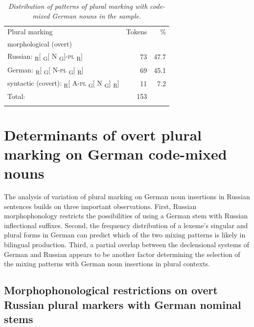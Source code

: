 \begin{table}
\begin{tabularx}{.81\textwidth}{l@{\hskip 30pt}r@{\hskip 30pt}r}
 \midrule  \addlinespace[2mm]
	Plural marking & Tokens & \% \\ \addlinespace[2mm] \midrule
			\addlinespace[2mm]
	morphological (overt) & & \\
	\hspace{10mm} Russian: {\textsubscript{R}[  \textsubscript{G}[ N \textsubscript{G}]-\textsc{pl} \textsubscript{R}]} & 73 & 47.7\\
	\hspace{10mm} German: {\textsubscript{R}[ \textsubscript{G}[ N-\textsc{pl} \textsubscript{G}] \textsubscript{R}]} & 69 & 45.1\\
	syntactic (covert): {\textsubscript{R}[ A-\textsc{pl} \textsubscript{G}[ N \textsubscript{G}] \textsubscript{R}]} & 11 & 7.2\\ 				
		\addlinespace[2mm]
	Total: & 153 & \\ 
			\addlinespace[2mm]
		\midrule
	\end{tabularx}
	\caption{\textit{Distribution of patterns of plural marking with code-mixed German nouns in the sample}.}
\label{tab:6:3}
\end{table}

\section{Determinants of overt plural marking on German code-mixed nouns}\label{morphophonology}

The analysis of variation of plural marking on German noun insertions in Russian sentences builds on three important observations. First, Russian morphophonology restricts the possibilities of using a German stem with Russian inflectional suffixes. Second, the frequency distribution of a lexeme’s singular and plural forms in German can predict which of the two mixing patterns is likely in bilingual production. Third, a partial overlap between the declensional systems of German and Russian appears to be another factor determining the selection of the mixing patterns with German noun insertions in plural contexts.

\subsection{Morphophonological restrictions on overt Russian plural markers with German nominal stems}{\label{morph-restr}}

